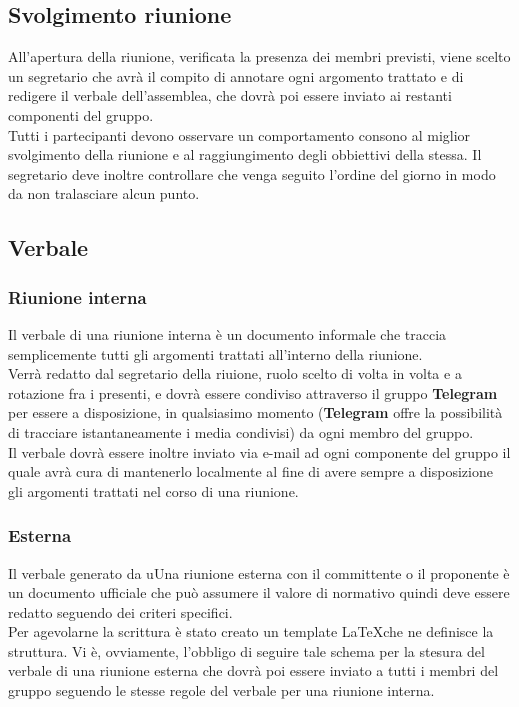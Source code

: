     \subsection{Svolgimento riunione}
      All’apertura della riunione, verificata la presenza dei membri previsti, viene scelto un segretario che avrà il compito di annotare ogni argomento trattato e di redigere il verbale
      dell’assemblea, che dovrà poi essere inviato ai restanti componenti del gruppo.\\
      Tutti i partecipanti devono osservare un comportamento consono al miglior svolgimento della riunione e al raggiungimento degli obbiettivi della stessa. Il segretario deve inoltre
      controllare che venga seguito l’ordine del giorno in modo da non tralasciare alcun punto.
    \subsection{Verbale}
      \subsubsection{Riunione interna}
        Il verbale di una riunione interna è un documento informale che traccia semplicemente tutti gli argomenti trattati all'interno della riunione.\\
        Verrà redatto dal segretario della riuione, ruolo scelto di volta in volta e a rotazione fra i presenti, e dovrà essere condiviso attraverso il gruppo \textbf{Telegram}
        per essere a disposizione, in qualsiasimo momento (\textbf{Telegram} offre la possibilità di tracciare istantaneamente i media condivisi) da ogni membro del gruppo.\\
        Il verbale dovrà essere inoltre inviato via e-mail ad ogni componente del gruppo il quale avrà cura di mantenerlo localmente al fine di avere sempre a disposizione
        gli argomenti trattati nel corso di una riunione.
      \subsubsection{Esterna}
        Il verbale generato da uUna riunione esterna con il committente o il proponente è un documento ufficiale che può assumere il valore di normativo quindi deve essere redatto
        seguendo dei criteri specifici.\\
        Per agevolarne la scrittura è stato creato un template \LaTeX  che ne definisce la struttura.
        Vi è, ovviamente, l'obbligo di seguire tale schema per la stesura del verbale di una riunione esterna che dovrà poi essere inviato a tutti i membri del gruppo seguendo
        le stesse regole del verbale per una riunione interna.
